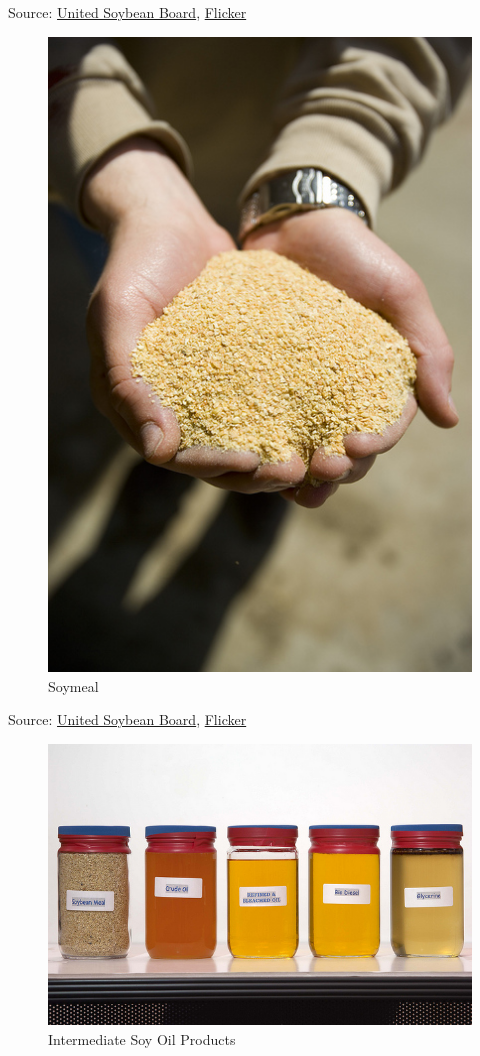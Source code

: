 \documentclass[]{book}
\theoremstyle{definition}
\theoremstyle{definition}
\theoremstyle{remark}
\begin{document}
Source: \href{http://unitedsoybean.org/}{United Soybean Board},
\href{https://www.flickr.com/photos/unitedsoybean/10059015936/}{Flicker}

\begin{figure}[htbp]
\centering
\includegraphics{images/soymeal.jpg}
\caption{Soymeal}
\end{figure}

Source: \href{http://unitedsoybean.org/}{United Soybean Board},
\href{https://www.flickr.com/photos/unitedsoybean/10059074033/}{Flicker}

\begin{figure}[htbp]
\centering
\includegraphics{images/crush_products.jpg}
\caption{Intermediate Soy Oil Products}
\end{figure}
\end{document}
